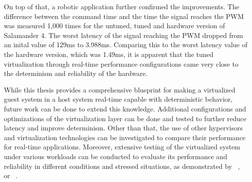 \documentclass[MMR,Master,english]{twbook}
\begin{document}
\bigskip \noindent On top of that, a robotic application further confirmed the improvements. The difference between the command time and the time the signal reaches the PWM was measured 1,000 times for the untuned, tuned and hardware version of Salamander 4. The worst latency of the signal reaching the PWM dropped from an inital value of 129ms to 3.988ms. Comparing this to the worst latency value of the hardware version, which was 1.49ms, it is apparent that the tuned virtualization through real-time performance configurations came very close to the determinism and reliability of the hardware.

\bigskip \noindent While this thesis provides a comprehensive blueprint for making a virtualized guest system in a host system real-time capable with deterministic behavior, future work can be done to extend this knowledge. Additional configurations and optimizations of the virtualization layer can be done and tested to further reduce latency and improve determinism. Other than that, the use of other hypervisors and virtualization technologies can be investigated to compare their performance for real-time applications. Moreover, extensive testing of the virtualized system under various workloads can be conducted to evaluate its performance and reliability in different conditions and stressed situations, as demonstrated by \citeauthor{huang2015performance}~\cite{huang2015performance}, \citeauthor{kirovaImpactModernVirtualization2019}~\cite{kirovaImpactModernVirtualization2019} or \citeauthor{adamPerformanceAssessmentLinux2021}~\cite{adamPerformanceAssessmentLinux2021}.
\end{document}
